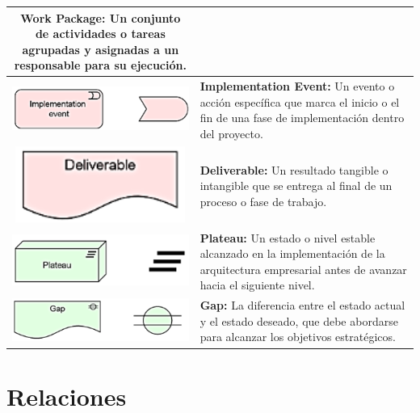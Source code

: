 \begin{longtable}{|c|p{8cm}|}
	\textbf{Work Package:} Un conjunto de actividades o tareas agrupadas y asignadas a un responsable para su ejecución.                                 \\
	\hline
	\includegraphics{anexos/ARCHI/strategy/event.png}       &
	\textbf{Implementation Event:} Un evento o acción específica que marca el inicio o el fin de una fase de implementación dentro del proyecto.         \\
	\hline
	\includegraphics{anexos/ARCHI/strategy/deliverable.png} &
	\textbf{Deliverable:} Un resultado tangible o intangible que se entrega al final de un proceso o fase de trabajo.                                    \\
	\hline
	\includegraphics{anexos/ARCHI/strategy/plateau.png}     &
	\textbf{Plateau:} Un estado o nivel estable alcanzado en la implementación de la arquitectura empresarial antes de avanzar hacia el siguiente nivel. \\
	\hline
	\includegraphics{anexos/ARCHI/strategy/gap.png}         &
	\textbf{Gap:} La diferencia entre el estado actual y el estado deseado, que debe abordarse para alcanzar los objetivos estratégicos.                 \\
	\hline
\end{longtable}

\section{Relaciones}

